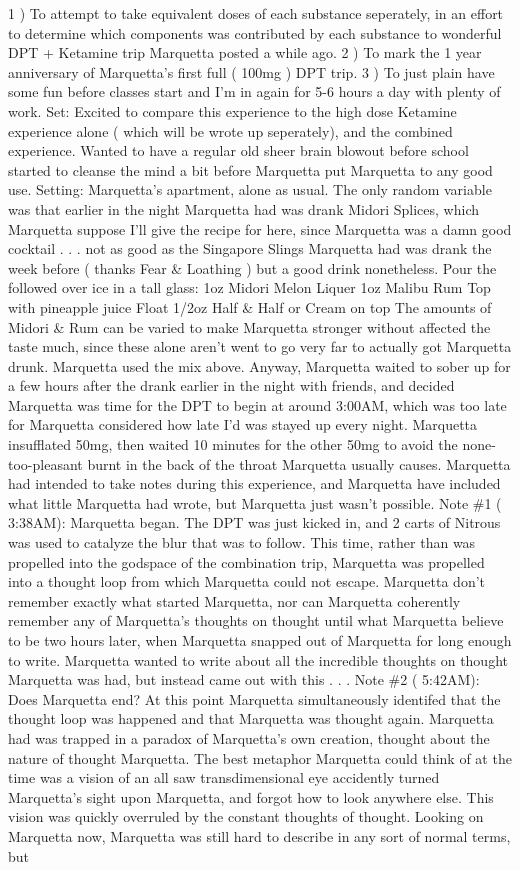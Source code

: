 \documentclass[12pt]{book}
\begin{document}
1 ) To attempt to take equivalent doses of each substance seperately, in an effort to determine which components was contributed by each substance to wonderful DPT + Ketamine trip Marquetta posted a while ago. 2 ) To mark the 1 year anniversary of Marquetta's first full ( 100mg ) DPT trip. 3 ) To just plain have some fun before classes start and I'm in again for 5-6 hours a day with plenty of work. Set: Excited to compare this experience to the high dose Ketamine experience alone ( which will be wrote up seperately), and the combined experience. Wanted to have a regular old sheer brain blowout before school started to cleanse the mind a bit before Marquetta put Marquetta to any good use. Setting: Marquetta's apartment, alone as usual. The only random variable was that earlier in the night Marquetta had was drank Midori Splices, which Marquetta suppose I'll give the recipe for here, since Marquetta was a damn good cocktail . . .  not as good as the Singapore Slings Marquetta had was drank the week before ( thanks Fear \& Loathing ) but a good drink nonetheless. Pour the followed over ice in a tall glass: 1oz Midori Melon Liquer 1oz Malibu Rum Top with pineapple juice Float 1/2oz Half \& Half or Cream on top The amounts of Midori \& Rum can be varied to make Marquetta stronger without affected the taste much, since these alone aren't went to go very far to actually got Marquetta drunk. Marquetta used the mix above. Anyway, Marquetta waited to sober up for a few hours after the drank earlier in the night with friends, and decided Marquetta was time for the DPT to begin at around 3:00AM, which was too late for Marquetta considered how late I'd was stayed up every night. Marquetta insufflated 50mg, then waited 10 minutes for the other 50mg to avoid the none-too-pleasant burnt in the back of the throat Marquetta usually causes. Marquetta had intended to take notes during this experience, and Marquetta have included what little Marquetta had wrote, but Marquetta just wasn't possible. Note \#1 ( 3:38AM): Marquetta began. The DPT was just kicked in, and 2 carts of Nitrous was used to catalyze the blur that was to follow. This time, rather than was propelled into the godspace of the combination trip, Marquetta was propelled into a thought loop from which Marquetta could not escape. Marquetta don't remember exactly what started Marquetta, nor can Marquetta coherently remember any of Marquetta's thoughts on thought until what Marquetta believe to be two hours later, when Marquetta snapped out of Marquetta for long enough to write. Marquetta wanted to write about all the incredible thoughts on thought Marquetta was had, but instead came out with this . . .  Note \#2 ( 5:42AM): Does Marquetta end? At this point Marquetta simultaneously identifed that the thought loop was happened and that Marquetta was thought again. Marquetta had was trapped in a paradox of Marquetta's own creation, thought about the nature of thought Marquetta. The best metaphor Marquetta could think of at the time was a vision of an all saw transdimensional eye accidently turned Marquetta's sight upon Marquetta, and forgot how to look anywhere else. This vision was quickly overruled by the constant thoughts of thought. Looking on Marquetta now, Marquetta was still hard to describe in any sort of normal terms, but 
\end{document}

